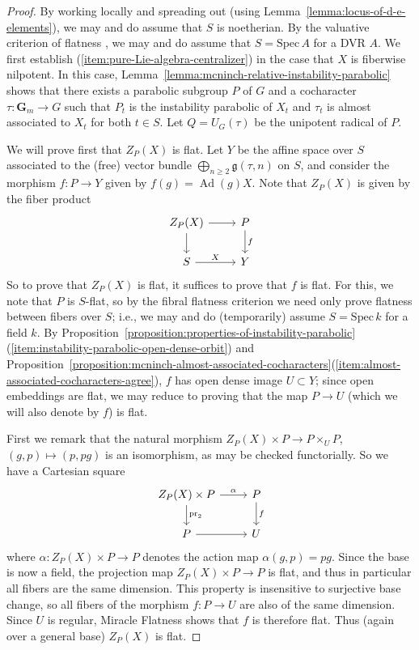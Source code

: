 \documentclass[11pt,reqno]{amsart}
\theoremstyle{definition}
\renewcommand{\rm}{\mathrm}
\newcommand{\Spec}{\mathrm{Spec} \,}
\newcommand{\bG}{{\mathbf G}}
\newcommand{\fg}{\mathfrak{g}}
\DeclareMathOperator{\Ad}{Ad}
\begin{document}
\begin{proof}
By working locally and spreading out (using Lemma~\ref{lemma:locus-of-d-e-elements}), we may and do assume that $S$ is noetherian. By the valuative criterion of flatness \cite[IV\textsubscript{3}, Thm.\ 11.8.1]{EGA}, we may and do assume that $S = \Spec A$ for a DVR $A$. We first establish (\ref{item:pure-Lie-algebra-centralizer}) in the case that $X$ is fiberwise nilpotent. In this case, Lemma~\ref{lemma:mcninch-relative-instability-parabolic} shows that there exists a parabolic subgroup $P$ of $G$ and a cocharacter $\tau: \bG_m \to G$ such that $P_t$ is the instability parabolic of $X_t$ and $\tau_t$ is almost associated to $X_t$ for both $t \in S$. Let $Q = U_G(\tau)$ be the unipotent radical of $P$. \smallskip

We will prove first that $Z_P(X)$ is flat. Let $Y$ be the affine space over $S$ associated to the (free) vector bundle $\bigoplus_{n \geq 2} \fg(\tau, n)$ on $S$, and consider the morphism $f: P \to Y$ given by $f(g) = \Ad(g)X$. Note that $Z_P(X)$ is given by the fiber product
\[
\begin{tikzcd}
Z_P(X) \arrow[r] \arrow[d]
    &P \arrow[d, "f"] \\
S \arrow[r, "X"]
    &Y
\end{tikzcd}
\]
So to prove that $Z_P(X)$ is flat, it suffices to prove that $f$ is flat. For this, we note that $P$ is $S$-flat, so by the fibral flatness criterion \cite[IV\textsubscript{3}, Thm.\ 11.3.10]{EGA} we need only prove flatness between fibers over $S$; i.e., we may and do (temporarily) assume $S = \Spec k$ for a field $k$. By Proposition~\ref{proposition:properties-of-instability-parabolic}(\ref{item:instability-parabolic-open-dense-orbit}) and Proposition~\ref{proposition:mcninch-almost-associated-cocharacters}(\ref{item:almost-associated-cocharacters-agree}), $f$ has open dense image $U \subset Y$; since open embeddings are flat, we may reduce to proving that the map $P \to U$ (which we will also denote by $f$) is flat.\smallskip

First we remark that the natural morphism $Z_P(X) \times P \to P \times_U P$, $(g, p) \mapsto (p, pg)$ is an isomorphism, as may be checked functorially. So we have a Cartesian square
\[
\begin{tikzcd}
Z_P(X) \times P \arrow[r, "\alpha"] \arrow[d, "\rm{pr}_2"]
    &P \arrow[d, "f"] \\
P \arrow[r]
    &U
\end{tikzcd}
\]
where $\alpha: Z_P(X) \times P \to P$ denotes the action map $\alpha(g, p) = pg$. Since the base is now a field, the projection map $Z_P(X) \times P \to P$ is flat, and thus in particular all fibers are the same dimension. This property is insensitive to surjective base change, so all fibers of the morphism $f: P \to U$ are also of the same dimension. Since $U$ is regular, Miracle Flatness \cite[Thm.\ 23.1]{Matsumura} shows that $f$ is therefore flat. Thus (again over a general base) $Z_P(X)$ is flat. \smallskip


\end{proof}
\end{document}
